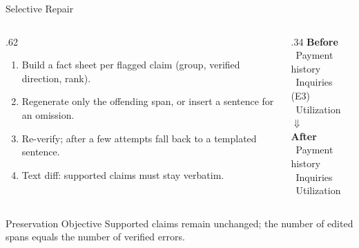 \documentclass[aspectratio=169,10pt]{beamer}
\newcommand{\tick}{\textcolor{green!45!black}{\ding{51}}}
\newcommand{\cross}{\textcolor{red!70!black}{\ding{55}}}
\begin{document}
\begin{frame}{Selective Repair}
  \begin{columns}[T]
    \begin{column}{.62\textwidth}
      \vspace{1.5ex}
      \begin{enumerate}\small
        \setlength{\itemsep}{1.4ex}
        \item Build a fact sheet per flagged claim (group, verified direction, rank).
        \item Regenerate only the offending span, or insert a sentence for an omission.
        \item Re-verify; after a few attempts fall back to a templated sentence.
        \item Text diff: supported claims must stay verbatim.
      \end{enumerate}
    \end{column}
    \begin{column}{.34\textwidth}
      \centering\small
      {\bfseries Before}\\[0.5ex]
      \tick\ Payment history\\
      \cross\ \colorbox{vrred}{Inquiries (E3)}\\
      \tick\ Utilization\\[0.5ex]
      $\Downarrow$\\[0.5ex]
      {\bfseries After}\\[0.5ex]
      \tick\ Payment history\\
      \tick\ \colorbox{vrgreen}{Inquiries}\\
      \tick\ Utilization
    \end{column}
  \end{columns}
  \vfill
  \begin{block}{Preservation Objective}
    Supported claims remain unchanged; the number of edited spans equals the number of verified errors.
  \end{block}
  \vspace{4ex}
\end{frame}
\end{document}
